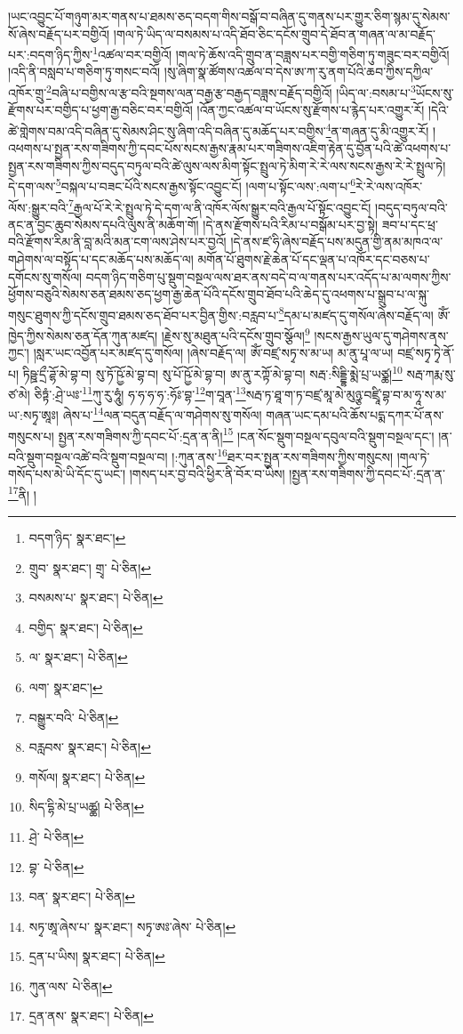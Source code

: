 །ཡང་འབྱུང་པོ་གཉུག་མར་གནས་པ་ཐམས་ཅད་བདག་གིས་བསྒོ་བ་བཞིན་དུ་གནས་པར་གྱུར་ཅིག་སྙམ་དུ་སེམས་སོ་ཞེས་བརྗོད་པར་བགྱིའོ། །གལ་ཏེ་ཡིད་ལ་བསམས་པ་འདི་ཐོབ་ཅིང་དངོས་གྲུབ་དེ་ཐོབ་ན་གཞན་ལ་མ་བརྗོད་པར་:བདག་ཉིད་ཀྱིས་\footnote{བདག་ཉིད་  སྣར་ཐང་། }འཚལ་བར་བགྱིའོ། །གལ་ཏེ་ཆོས་འདི་གྲུབ་ན་བཟླས་པར་བགྱི་གཅིག་ཏུ་གཟུང་བར་བགྱིའོ། །འདི་ནི་བསླབ་པ་གཅིག་ཏུ་གསང་བའོ། །སུ་ཞིག་སྣ་ཚོགས་འཚལ་བ་དེས་ཨ་ཀ་རུ་ནག་པོའི་ཆབ་ཀྱིས་དཀྱིལ་འཁོར་གྲུ་\footnote{གྲུབ་  སྣར་ཐང་། གྲྭ་  པེ་ཅིན། }བཞི་པ་བགྱིས་ལ་རྩ་བའི་སྔགས་ལན་བརྒྱ་རྩ་བརྒྱད་བཟླས་བརྗོད་བགྱིའོ། །ཡིད་ལ་:བསམ་པ་\footnote{བསམས་པ་  སྣར་ཐང་།  པེ་ཅིན། }ཡོངས་སུ་རྫོགས་པར་བགྱིད་པ་ཕྱག་རྒྱ་བཅིང་བར་བགྱིའོ། །འོན་ཀྱང་འཚལ་བ་ཡོངས་སུ་རྫོགས་པ་རྙེད་པར་འགྱུར་རོ། །དེའི་ཚེ་གླེགས་བམ་འདི་བཞིན་དུ་སེམས་ཤིང་སུ་ཞིག་འདི་བཞིན་དུ་མཆོད་པར་བགྱིས་\footnote{བགྱིད་  སྣར་ཐང་།  པེ་ཅིན། }ན་གཞན་དུ་མི་འགྱུར་རོ། །འཕགས་པ་སྤྱན་རས་གཟིགས་ཀྱི་དབང་པོས་སངས་རྒྱས་རྣམ་པར་གཟིགས་འཇིག་རྟེན་དུ་བྱོན་པའི་ཚེ་འཕགས་པ་སྤྱན་རས་གཟིགས་ཀྱིས་བདུད་བཏུལ་བའི་ཚེ་ལུས་ལས་མིག་སྟོང་སྤྲུལ་ཏེ་མིག་རེ་རེ་ལས་སངས་རྒྱས་རེ་རེ་སྤྲུལ་ཏེ། དེ་དག་ལས་\footnote{ལ་  སྣར་ཐང་།  པེ་ཅིན། }བསྐལ་པ་བཟང་པོའི་སངས་རྒྱས་སྟོང་འབྱུང་ངོ། །ལག་པ་སྟོང་ལས་:ལག་པ་\footnote{ལག་  སྣར་ཐང་། }རེ་རེ་ལས་འཁོར་ལོས་:སྒྱུར་བའི་\footnote{བསྒྱུར་བའི་  པེ་ཅིན། }རྒྱལ་པོ་རེ་རེ་སྤྲུལ་ཏེ་དེ་དག་ལ་ནི་འཁོར་ལོས་སྒྱུར་བའི་རྒྱལ་པོ་སྟོང་འབྱུང་ངོ། །བདུད་བཏུལ་བའི་ནང་ན་བྱང་ཆུབ་སེམས་དཔའི་ལུས་ནི་མཆོག་གོ། །དེ་ནས་རྫོགས་པའི་རིམ་པ་བསྒོམ་པར་བྱ་སྟེ། ཟབ་པ་དང་ཕྲ་བའི་རྫོགས་རིམ་ནི་བླ་མའི་མན་ངག་ལས་ཤེས་པར་བྱའོ། །དེ་ནས་ཛ་ཧི་ཞེས་བརྗོད་པས་མདུན་གྱི་ནམ་མཁའ་ལ་གཤེགས་ལ་བསྟོད་པ་དང་མཆོད་པས་མཆོད་ལ། མགོན་པོ་ཐུགས་རྗེ་ཆེན་པོ་དང་ལྡན་པ་འཁོར་དང་བཅས་པ་དགོངས་སུ་གསོལ། བདག་ཉིད་གཅིག་པུ་སྡུག་བསྔལ་ལས་ཐར་ནས་བདེ་བ་ལ་གནས་པར་འདོད་པ་མ་ལགས་ཀྱིས་ཕྱོགས་བཅུའི་སེམས་ཅན་ཐམས་ཅད་ཕྱག་རྒྱ་ཆེན་པོའི་དངོས་གྲུབ་ཐོབ་པའི་ཆེད་དུ་འཕགས་པ་སྒྲུབ་པ་ལ་སྐུ་གསུང་ཐུགས་ཀྱི་དངོས་གྲུབ་ཐམས་ཅད་ཐོབ་པར་བྱིན་གྱིས་:བརླབ་པ་\footnote{བརླབས་  སྣར་ཐང་།  པེ་ཅིན། }དམ་པ་མཛད་དུ་གསོལ་ཞེས་བརྗོད་ལ། ཨོཾ་ཁྱེད་ཀྱིས་སེམས་ཅན་དོན་ཀུན་མཛད། །རྗེས་སུ་མཐུན་པའི་དངོས་གྲུབ་སྩོལ།\footnote{གསོལ།  སྣར་ཐང་།  པེ་ཅིན། } །སངས་རྒྱས་ཡུལ་དུ་གཤེགས་ནས་ཀྱང་། །སླར་ཡང་འབྱོན་པར་མཛད་དུ་གསོལ། །ཞེས་བརྗོད་ལ། ཨོཾ་བཛྲ་སཏྭ་ས་མ་ཡ། མ་ནུ་པཱ་ལ་ཡ། བཛྲ་སཏྭ་ཏྭེ་ནོ་པ། ཏིཥྛ་དྲྀ་ཌྷོ་མེ་བྷ་བ། སུ་ཏོ་ཥྱོ་མེ་བྷ་བ། སུ་པོ་ཥྱོ་མེ་བྷ་བ། ཨ་ནུ་རཀྟོ་མེ་བྷ་བ། སརྦ་:སིདྡྷི་མྨེ་པྲ་ཡཙྪ།\footnote{སིད་དྷི་མེ་པྲ་ཡཚྪ།  པེ་ཅིན། } སརྦ་ཀརྨ་སུ་ཙ་མེ། ཅིཏྟཾ་:ཤྲེ་ཡཿ་\footnote{ཤྲེ་  པེ་ཅིན། }ཀུ་རུ་ཧཱུཾ། ཧ་ཧ་ཧ་ཧ་:ཧོཿ་བྷ་\footnote{བྷ་  པེ་ཅིན། }ག་བཱན་\footnote{བན་  སྣར་ཐང་།  པེ་ཅིན། }སརྦ་ཏ་ཐཱ་ག་ཏ་བཛྲ་མཱ་མེ་མུཉྩ་བཛྲཱི་བྷ་བ་མ་ཧཱ་ས་མ་ཡ་:སཏྭ་ཨཱཿ། ཞེས་པ་\footnote{སཏྭ་ཨཱ་ཞེས་པ་  སྣར་ཐང་། སཏྭ་ཨཿ་ཞེས་  པེ་ཅིན། }ལན་བདུན་བརྗོད་ལ་གཤེགས་སུ་གསོལ། གཞན་ཡང་དམ་པའི་ཆོས་པདྨ་དཀར་པོ་ནས་གསུངས་པ། སྤྱན་རས་གཟིགས་ཀྱི་དབང་པོ་:དྲན་ན་ནི།\footnote{དྲན་པ་ཡིས།  སྣར་ཐང་།  པེ་ཅིན། } །ངན་སོང་སྡུག་བསྔལ་དབུལ་བའི་སྡུག་བསྔལ་དང་། །ན་བའི་སྡུག་བསྔལ་འཚེ་བའི་སྡུག་བསྔལ་བ། །:ཀུན་ནས་\footnote{ཀུན་ལས་  པེ་ཅིན། }ཐར་བར་སྤྱན་རས་གཟིགས་ཀྱིས་གསུངས། །གལ་ཏེ་གསོད་པས་མེ་ཡི་དོང་དུ་ཡང་། །གསད་པར་བྱ་བའི་ཕྱིར་ནི་བོར་བ་ཡིས། །སྤྱན་རས་གཟིགས་ཀྱི་དབང་པོ་:དྲན་ན་\footnote{དྲན་ནས་  སྣར་ཐང་།  པེ་ཅིན། }ནི། །
